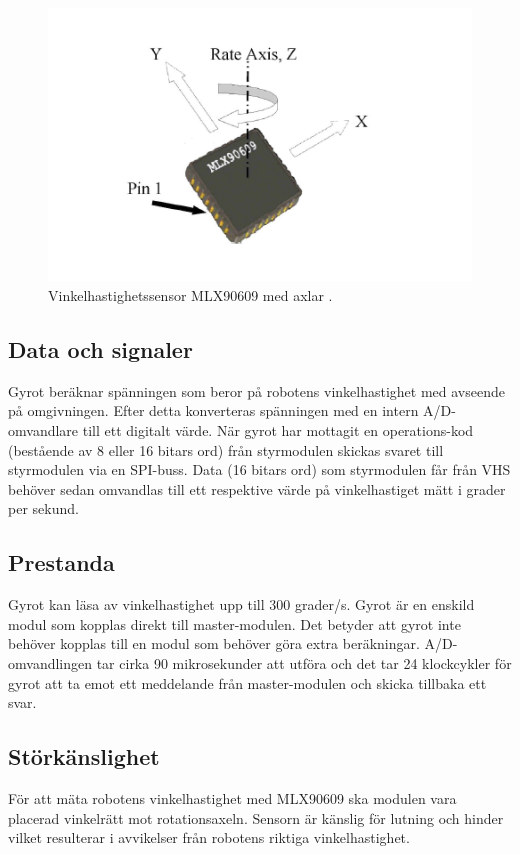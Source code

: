 \documentclass[11pt]{article}
\begin{document}
\begin{flushleft}
\begin{figure}[H]
\centering
\includegraphics[scale=0.6]{gyro}
\caption{Vinkelhastighetssensor MLX90609 med axlar \autocite{vanheden-gyro}.}
\label{fig:gyro}
\end{figure}
 
\subsection{Data och signaler}
Gyrot beräknar spänningen som beror på robotens vinkelhastighet med avseende på omgivningen. Efter detta konverteras spänningen med en intern A/D-omvandlare till ett digitalt värde. När gyrot har mottagit en operations-kod (bestående av 8 eller 16 bitars ord) från styrmodulen skickas svaret till styrmodulen via en SPI-buss. Data (16 bitars ord) som styrmodulen får från VHS behöver sedan omvandlas till ett respektive värde på vinkelhastiget mätt i grader per sekund. 
  
\subsection{Prestanda}
Gyrot kan läsa av vinkelhastighet upp till 300 grader/s. Gyrot är en enskild modul som kopplas direkt till master-modulen. Det betyder att gyrot inte behöver kopplas till en modul som behöver göra extra beräkningar. A/D-omvandlingen tar cirka 90 mikrosekunder att utföra och det tar 24 klockcykler för gyrot att ta emot ett meddelande från master-modulen och skicka tillbaka ett svar.

 \subsection{Störkänslighet}
För att mäta robotens vinkelhastighet med MLX90609 ska modulen vara placerad vinkelrätt mot rotationsaxeln. Sensorn är känslig för lutning och hinder vilket resulterar i avvikelser från robotens riktiga vinkelhastighet.


\end{flushleft}
\end{document}
